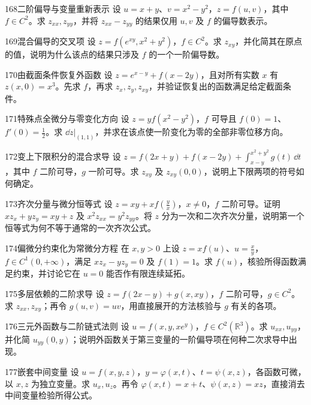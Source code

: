 \begin{exercise}{168}{二阶偏导与变量重新表示}
设 $u=x+y$、$v=x^2-y^2$，$z=f(u,v)$，其中 $f\in C^2$。求 $z_{xx},z_{yy}$，并将 $z_{xx}-z_{yy}$ 的结果仅用 $u,v$ 及 $f$ 的偏导数表示。
\end{exercise}
\begin{exercise}{169}{混合偏导的交叉项}
设 $z=f(e^{xy},x^2+y^2)$，$f\in C^2$。求 $z_{xy}$，并化简其在原点的值，说明为什么该点的结果只涉及 $f$ 的一个一阶偏导数。
\end{exercise}
\begin{exercise}{170}{由截面条件恢复外函数}
设 $z=e^{x-y}+f(x-2y)$，且对所有实数 $x$ 有 $z(x,0)=x^3$。先求 $f$，再求 $z_x,z_y,z_{xy}$，并验证恢复出的函数满足给定截面条件。
\end{exercise}
\begin{exercise}{171}{特殊点全微分与零变化方向}
设 $z=yf(x^2-y^2)$，$f$ 可导且 $f(0)=1$、$f'(0)=\frac12$。求 $\dd z|_{(1,1)}$，并求在该点使一阶变化为零的全部非零位移方向。
\end{exercise}
\begin{exercise}{172}{变上下限积分的混合求导}
设 $z=f(2x+y)+f(x-2y)+\int_{x-y}^{x^2+y^2}g(t)\,\dd t$，其中 $f$ 二阶可导，$g$ 一阶可导。求 $z_{xy}$ 及 $z_{xy}(0,0)$，说明上下限两项的符号如何确定。
\end{exercise}
\begin{exercise}{173}{齐次分量与微分恒等式}
设 $z=xy+xf(\frac yx)$，$x\ne0$，$f$ 二阶可导。证明 $xz_x+yz_y=xy+z$ 及 $x^2z_{xx}=y^2z_{yy}$。将 $z$ 分为一次和二次齐次分量，说明第一个恒等式为何不等于通常的一次齐次公式。
\end{exercise}
\begin{exercise}{174}{偏微分约束化为常微分方程}
在 $x,y>0$ 上设 $z=xf(u)$、$u=\frac xy$，$f\in C^1(0,+\infty)$，满足 $xz_x-yz_y=0$ 及 $f(1)=1$。求 $f(u)$，核验所得函数满足约束，并讨论它在 $u=0$ 能否作有限连续延拓。
\end{exercise}
\begin{exercise}{175}{多层依赖的二阶求导}
设 $z=f(2x-y)+g(x,xy)$，$f$ 二阶可导，$g\in C^2$。求 $z_{xx},z_{xy}$；再令 $g(u,v)=uv$，用直接展开的方法核验与 $g$ 有关的各项。
\end{exercise}
\begin{exercise}{176}{三元外函数与二阶链式法则}
设 $u=f(x,y,xe^y)$，$f\in C^2(\mathbb R^3)$。求 $u_{xx},u_{yy}$，并化简 $u_{yy}(0,y)$；说明外函数关于第三变量的一阶偏导项在何种二次求导中出现。
\end{exercise}
\begin{exercise}{177}{嵌套中间变量}
设 $u=f(x,y,z)$，$y=\varphi(x,t)$、$t=\psi(x,z)$，各函数可微，以 $x,z$ 为独立变量。求 $u_x,u_z$。再令 $\varphi(x,t)=x+t$、$\psi(x,z)=xz$，直接消去中间变量检验所得公式。
\end{exercise}

